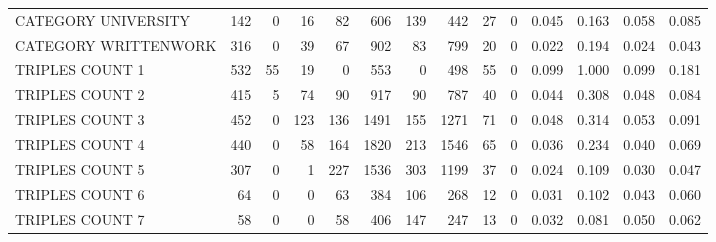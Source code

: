 \begin{tabular}{lrrrrrrrrrllll}
 CATEGORY UNIVERSITY      &             142 &             0 &              16 &              82 &             606 &  139 &  442 &   27 &    0 & 0.045 & 0.163 & 0.058 & 0.085 \\
 CATEGORY WRITTENWORK     &             316 &             0 &              39 &              67 &             902 &   83 &  799 &   20 &    0 & 0.022 & 0.194 & 0.024 & 0.043 \\
 TRIPLES COUNT 1          &             532 &            55 &              19 &               0 &             553 &    0 &  498 &   55 &    0 & 0.099 & 1.000 & 0.099 & 0.181 \\
 TRIPLES COUNT 2          &             415 &             5 &              74 &              90 &             917 &   90 &  787 &   40 &    0 & 0.044 & 0.308 & 0.048 & 0.084 \\
 TRIPLES COUNT 3          &             452 &             0 &             123 &             136 &            1491 &  155 & 1271 &   71 &    0 & 0.048 & 0.314 & 0.053 & 0.091 \\
 TRIPLES COUNT 4          &             440 &             0 &              58 &             164 &            1820 &  213 & 1546 &   65 &    0 & 0.036 & 0.234 & 0.040 & 0.069 \\
 TRIPLES COUNT 5          &             307 &             0 &               1 &             227 &            1536 &  303 & 1199 &   37 &    0 & 0.024 & 0.109 & 0.030 & 0.047 \\
 TRIPLES COUNT 6          &              64 &             0 &               0 &              63 &             384 &  106 &  268 &   12 &    0 & 0.031 & 0.102 & 0.043 & 0.060 \\
 TRIPLES COUNT 7          &              58 &             0 &               0 &              58 &             406 &  147 &  247 &   13 &    0 & 0.032 & 0.081 & 0.050 & 0.062 \\
\hline
\end{tabular}